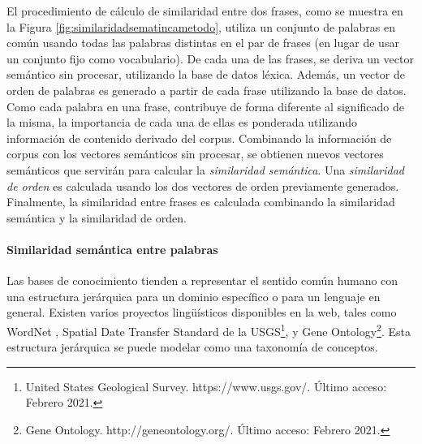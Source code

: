 El procedimiento de cálculo de similaridad entre dos frases, como se muestra en la Figura \ref{fig:similaridadsematincametodo}, utiliza un conjunto de palabras en común usando todas las palabras distintas en el par de frases (en lugar de usar un conjunto fijo como vocabulario). De cada una de las frases, se deriva un vector semántico sin procesar, utilizando la base de datos léxica. Además, un vector de orden de palabras es generado a partir de cada frase utilizando la base de datos. Como cada palabra en una frase, contribuye de forma diferente al significado de la misma, la importancia de cada una de ellas es ponderada utilizando información de contenido derivado del corpus. Combinando la información de corpus con los vectores semánticos sin procesar, se obtienen nuevos vectores semánticos que servirán para calcular la \textit{similaridad semántica}. Una \textit{similaridad de orden} es calculada usando los dos vectores de orden previamente generados. Finalmente, la similaridad entre frases es calculada combinando la similaridad semántica y la similaridad de orden.

\paragraph{Similaridad semántica entre palabras}
Las bases de conocimiento tienden a representar el sentido común humano con una estructura jerárquica para un dominio específico o para un lenguaje en general. Existen varios proyectos lingüísticos disponibles en la web, tales como WordNet \citep{miller1995wordnet}, Spatial Date Transfer Standard de la USGS\footnote{United States Geological Survey. https://www.usgs.gov/. Último acceso: Febrero 2021.}, y Gene Ontology\footnote{Gene Ontology. http://geneontology.org/. Último acceso: Febrero 2021.}. Esta estructura jerárquica se puede modelar como una taxonomía de conceptos.

